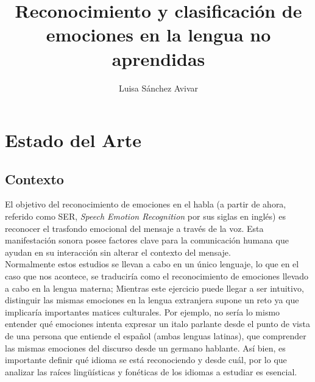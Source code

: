\documentclass[11pt,a4paper,spanish]{book}
\begin{document}
	\title{Reconocimiento y clasificación de emociones en la lengua no aprendidas}
	\author{Luisa Sánchez Avivar}
	
	\chapter{Estado del Arte}
	\section{Contexto}
	El objetivo del reconocimiento de emociones en el habla (a partir de ahora, referido como  SER, \emph{Speech Emotion Recognition} por sus siglas en inglés) es reconocer el trasfondo emocional del mensaje a través de la voz. Esta manifestación sonora posee factores clave para la comunicación humana que ayudan en su interacción sin alterar el contexto del mensaje.\\
	Normalmente estos estudios se llevan a cabo en un único lenguaje, lo que en el caso que nos acontece, se traduciría como el reconocimiento de emociones llevado a cabo en la lengua materna; Mientras este ejercicio puede llegar a ser intuitivo, distinguir las mismas emociones en la lengua extranjera supone un reto ya que implicaría importantes matices culturales. Por ejemplo, no sería lo mismo entender qué emociones intenta expresar un italo parlante desde el punto de vista de una persona que entiende el español (ambas lenguas latinas), que comprender las mismas emociones del discurso desde un germano hablante. Así bien, es importante definir qué idioma se está reconociendo y desde cuál, por lo que analizar las raíces lingüísticas y fonéticas de los idiomas a estudiar es esencial. \hfill \break
	
\end{document}

